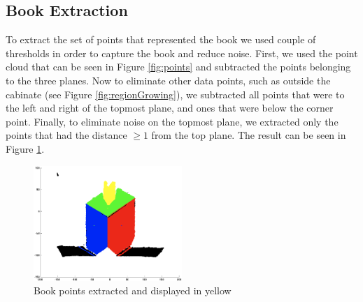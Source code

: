 \subsection{Book Extraction}
To extract the set of points that represented the book we used couple of thresholds in order to capture the book and reduce noise. First, we used the point cloud that can be seen in Figure \ref{fig:points} and subtracted the points belonging to the three planes. Now to eliminate other data points, such as outside the cabinate (see Figure \ref{fig:regionGrowing}), we subtracted all points that were to the left and right of the topmost plane, and ones that were below the corner point. Finally, to eliminate noise on the topmost plane, we extracted only the points that had the distance $\geq 1$ from the top plane. The result can be seen in Figure \ref{fig:bookPoints}.

\begin{figure}[H]
	\centering
	\includegraphics[width=0.5\textwidth]{Images/6-BookPoints(1).png}
	\caption{Book points extracted and displayed in yellow}
	\label{fig:bookPoints}
\end{figure}